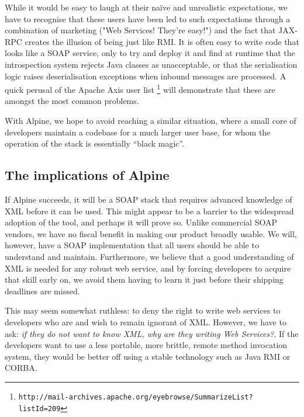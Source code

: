While it would be easy to laugh at their na\"{i}ve and unrealistic
expectations, we have to recognise that these users have been led to
such expectations through a combination of marketing ("Web Services!
They're easy!") and the fact that JAX-RPC creates the illusion of
being just like RMI. It is often easy to write code that looks like a
SOAP service, only to try and deploy it and find at runtime that the
introspection system rejects Java classes as unacceptable, or that the
serialisation logic raises deserialisation exceptions when inbound
messages are processed. A quick perusal of the Apache Axis user list
\footnote{{\small \tt http://mail-archives.apache.org/eyebrowse/SummarizeList?listId=209}}
will demonstrate that these are amongst the most common problems.

With Alpine, we hope to avoid reaching a similar situation, where a
small core of developers maintain a codebase for a much larger user
base, for whom the operation of the stack is essentially ``black
magic''.

\subsection{The implications of Alpine}

If Alpine succeeds, it will be a SOAP stack that requires advanced
knowledge of XML before it can be used. This might appear to be a
barrier to the widespread adoption of the tool, and perhaps it will
prove so. Unlike commercial SOAP vendors, we have no fiscal benefit in
making our product broadly usable. We will, however, have a SOAP
implementation that all users should be able to understand and
maintain.  Furthermore, we believe that a good understanding of XML is
needed for any robust web service, and by forcing developers to
acquire that skill early on, we avoid them having to learn it just
before their shipping deadlines are missed.

This may seem somewhat ruthless: to deny the right to write web
services to developers who are and wish to remain ignorant of XML.
However, we have to ask: \emph{if they do not want to know XML, why are
they writing Web Services?}. If the developers want to use a less portable,
more brittle, remote method invocation system, they would be better off
using a stable technology such as Java RMI or CORBA.
